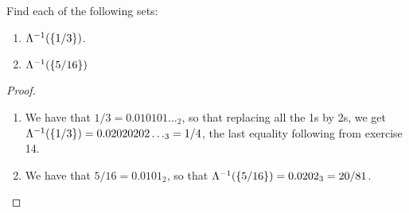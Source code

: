 \begin{exercise}{21}
Find each of the following sets:
\begin{enumerate}
    \item $\Lambda^{-1}(\{1/3\})$.
    \item $\Lambda^{-1}(\{5/16\})$
\end{enumerate}
\end{exercise}
\begin{proof}
\begin{enumerate}
    \item We have that $1/3 = 0.010101\dots_2$, so that replacing all the 1s by 2s, we get $\Lambda^{-1}(\{1/3\}) = 0.02020202\dots_3 = 1/4$, the last equality following from exercise 14.
    \item We have that $5/16 = 0.0101_2$, so that $\Lambda^{-1}(\{5/16\}) = 0.0202_3 = 20/81$.
\end{enumerate}
\end{proof}
